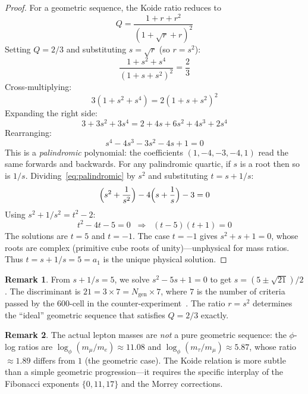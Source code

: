 \documentclass[12pt,a4paper]{article}
\theoremstyle{definition}
\newtheorem{remark}{Remark}
\begin{document}
\begin{proof}
For a geometric sequence, the Koide ratio reduces to
\begin{equation}
Q = \frac{1 + r + r^2}{(1 + \sqrt{r} + r)^2}
\end{equation}
Setting $Q = 2/3$ and substituting $s = \sqrt{r}$ (so $r = s^2$):
\begin{equation}
\frac{1 + s^2 + s^4}{(1 + s + s^2)^2} = \frac{2}{3}
\end{equation}
Cross-multiplying:
\begin{equation}
3(1 + s^2 + s^4) = 2(1 + s + s^2)^2
\end{equation}
Expanding the right side:
\begin{equation}
3 + 3s^2 + 3s^4 = 2 + 4s + 6s^2 + 4s^3 + 2s^4
\end{equation}
Rearranging:
\begin{equation}
s^4 - 4s^3 - 3s^2 - 4s + 1 = 0
\label{eq:palindromic}
\end{equation}
This is a \emph{palindromic} polynomial: the coefficients $(1, -4, -3, -4, 1)$ read the same forwards and backwards.  For any palindromic quartic, if $s$ is a root then so is $1/s$.  Dividing~\eqref{eq:palindromic} by $s^2$ and substituting $t = s + 1/s$:
\begin{equation}
\Bigl(s^2 + \frac{1}{s^2}\Bigr) - 4\Bigl(s + \frac{1}{s}\Bigr) - 3 = 0
\end{equation}
Using $s^2 + 1/s^2 = t^2 - 2$:
\begin{equation}
t^2 - 4t - 5 = 0 \;\;\Longrightarrow\;\; (t - 5)(t + 1) = 0
\end{equation}
The solutions are $t = 5$ and $t = -1$.  The case $t = -1$ gives $s^2 + s + 1 = 0$, whose roots are complex (primitive cube roots of unity)---unphysical for mass ratios.  Thus $t = s + 1/s = 5 = a_1$ is the unique physical solution.
\end{proof}

\begin{remark}
From $s + 1/s = 5$, we solve $s^2 - 5s + 1 = 0$ to get $s = (5 \pm \sqrt{21})/2$.  The discriminant is $21 = 3 \times 7 = N_{\mathrm{gen}} \times 7$, where $7$ is the number of criteria passed by the 600-cell in the counter-experiment~\cite{Anghelina2026}.  The ratio $r = s^2$ determines the ``ideal'' geometric sequence that satisfies $Q = 2/3$ exactly.
\end{remark}

\begin{remark}
The actual lepton masses are \emph{not} a pure geometric sequence: the $\phi$-log ratios are $\log_\phi(m_\mu/m_e) \approx 11.08$ and $\log_\phi(m_\tau/m_\mu) \approx 5.87$, whose ratio $\approx 1.89$ differs from $1$ (the geometric case).  The Koide relation is more subtle than a simple geometric progression---it requires the specific interplay of the Fibonacci exponents $\{0, 11, 17\}$ and the Morrey corrections.
\end{remark}
\end{document}
